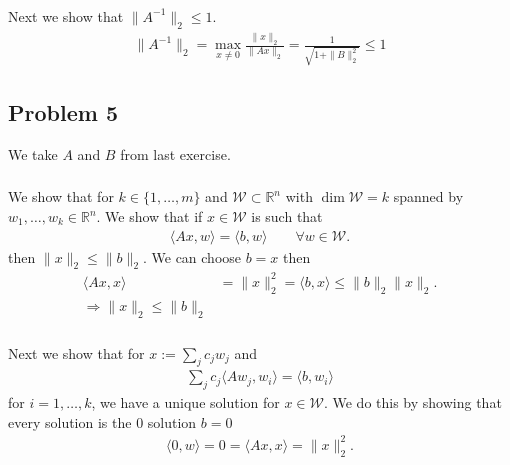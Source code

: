 \subsubsection{}
Next we show that $\|A^{-1}\|_2 \le 1$.
\begin{align}
    \|A^{-1}\|_2 = \max_{x\neq 0} \frac{\|x\|_2}{\|Ax\|_2} =
    \frac{1}{\sqrt{1+\|B\|_2^2}} \le 1
\end{align}
\subsection{Problem 5}
We take $A$ and $B$ from last exercise.
\subsubsection{}
We show that for $k \in \{1,\ldots,m\}$ and $\mathcal{W} \subset
\mathbb{R}^n$ with $\dim \mathcal{W} = k$ spanned by $w_1,\ldots,w_k \in
\mathbb{R}^n$. We show that if $x \in \mathcal{W}$ is such that
\begin{align}
    \langle Ax, w\rangle = \langle b , w \rangle \qquad \forall w\in
    \mathcal{W}.
\end{align}
then $\|x\|_2 \le \|b\|_2$. We can choose $b = x$ then
\begin{align}
    \langle Ax, x\rangle &= \|x\|_2^2 = \langle b, x\rangle \leq
    \|b\|_2\|x\|_2.\\
    \Rightarrow \|x\|_2 \le \|b\|_2
\end{align}
\subsubsection{}
Next we show that for $x :=\sum_j c_j w_j$ and
\begin{align}
    \sum_j c_j \langle Aw_j, w_i\rangle = \langle b , w_i\rangle
\end{align}
for $i = 1, \ldots , k$, we have a unique solution for $x \in \mathcal{W}$.
We do this by showing that every solution is the 0 solution $b=0$
\begin{align}
    \langle 0 , w\rangle = 0 = \langle Ax ,x \rangle = \|x\|_2^2.
\end{align}

